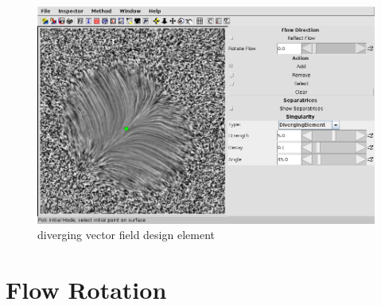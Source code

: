 \documentclass[a4paper,10pt,notitlepage]{scrreprt}
\begin{document}
\begin{figure}
  \centering
  \includegraphics[scale=0.5]{img-3-2/diverging.png}
  \caption{diverging vector field design element}
  \label{fig:diverging}
\end{figure}

\section{Flow Rotation}
\end{document}
